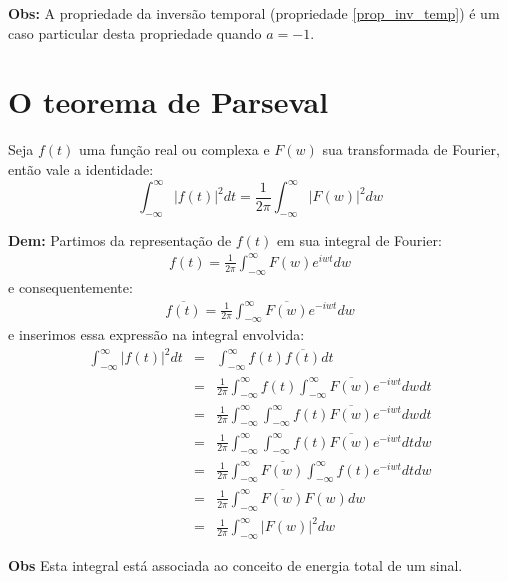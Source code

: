 \documentclass[a4paper,10pt]{book}
\begin{document}
 
{\bf Obs:} A propriedade da inversão temporal (propriedade \ref{prop_inv_temp}) é um caso particular desta propriedade quando $a=-1$.



\section{O teorema de Parseval}
\label{prop_teo_pars} Seja $f(t)$ uma função real ou complexa e $F(w)$ sua transformada de Fourier, então vale a identidade:
\begin{equation}\int_{-\infty}^\infty |f(t)|^2dt = \frac{1}{2\pi} \int_{-\infty}^\infty |F(w)|^2dw\end{equation}


{\bf Dem:}
Partimos da representação de $f(t)$ em sua integral de Fourier:
\begin{eqnarray*}
f(t)=\frac{1}{2\pi}\int_{-\infty}^\infty F(w)e^{iwt}dw
\end{eqnarray*}
e consequentemente:
\begin{eqnarray*}
\overline{f(t)}=\frac{1}{2\pi}\int_{-\infty}^\infty \overline{F(w)}e^{-iwt}dw
\end{eqnarray*}
e inserimos essa expressão na integral envolvida:
\begin{eqnarray*}
\int_{-\infty}^\infty |f(t)|^2dt &=&\int_{-\infty}^\infty f(t)\overline{f(t)} dt\\
&=&\frac{1}{2\pi}\int_{-\infty}^\infty f(t)\int_{-\infty}^\infty \overline{F(w)}e^{-iwt}dw dt\\
&=&\frac{1}{2\pi}\int_{-\infty}^\infty \int_{-\infty}^\infty f(t) \overline{F(w)}e^{-iwt}dw dt\\
&=&\frac{1}{2\pi}\int_{-\infty}^\infty \int_{-\infty}^\infty f(t) \overline{F(w)}e^{-iwt}dt dw\\
&=&\frac{1}{2\pi}\int_{-\infty}^\infty \overline{F(w)}\int_{-\infty}^\infty f(t) e^{-iwt}dt dw\\
&=&\frac{1}{2\pi}\int_{-\infty}^\infty \overline{F(w)}F(w) dw\\
&=&\frac{1}{2\pi}\int_{-\infty}^\infty |F(w)|^2 dw
\end{eqnarray*}

{\bf Obs} Esta integral está associada ao conceito de energia total de um sinal. 
\end{document}
